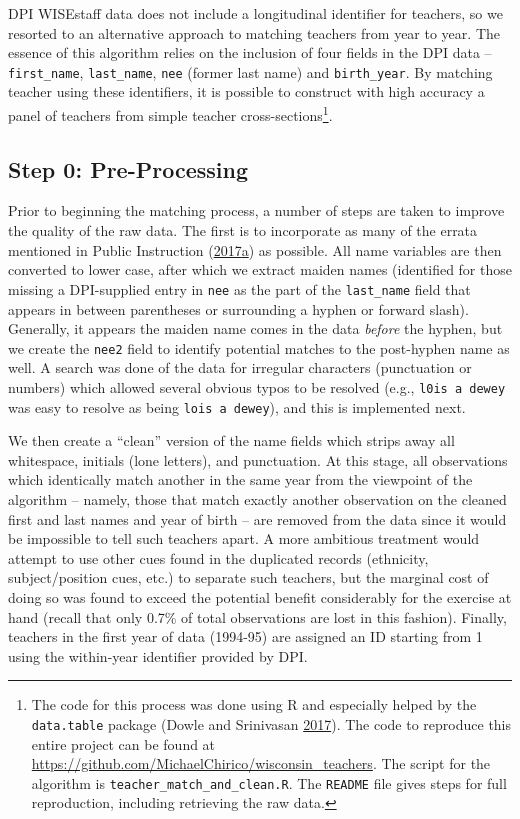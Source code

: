\documentclass[12pt,]{article}
\let\rmarkdownfootnote\footnote%
\def\footnote{\protect\rmarkdownfootnote}
\newcommand{\TAG}[1]{}
\begin{document}
\TAG{BEGIN_APPENDIX}

DPI WISEstaff data does not include a longitudinal identifier for
teachers, so we resorted to an alternative approach to matching teachers
from year to year. The essence of this algorithm relies on the inclusion
of four fields in the DPI data -- \texttt{first\_name},
\texttt{last\_name}, \texttt{nee} (former last name) and
\texttt{birth\_year}. By matching teacher using these identifiers, it is
possible to construct with high accuracy a panel of teachers from simple
teacher cross-sections\footnote{The code for this process was done using
  R and especially helped by the \texttt{data.table} package (Dowle and
  Srinivasan \protect\hyperlink{ref-dowle}{2017}). The code to reproduce
  this entire project can be found at
  \url{https://github.com/MichaelChirico/wisconsin_teachers}. The script
  for the algorithm is \texttt{teacher\_match\_and\_clean.R}. The
  \texttt{README} file gives steps for full reproduction, including
  retrieving the raw data.}.

\subsection{Step 0: Pre-Processing}\label{step-0-pre-processing}

Prior to beginning the matching process, a number of steps are taken to
improve the quality of the raw data. The first is to incorporate as many
of the errata mentioned in Public Instruction
(\protect\hyperlink{ref-dpi_errata}{2017}\protect\hyperlink{ref-dpi_errata}{a})
as possible. All name variables are then converted to lower case, after
which we extract maiden names (identified for those missing a
DPI-supplied entry in \texttt{nee} as the part of the
\texttt{last\_name} field that appears in between parentheses or
surrounding a hyphen or forward slash). Generally, it appears the maiden
name comes in the data \emph{before} the hyphen, but we create the
\texttt{nee2} field to identify potential matches to the post-hyphen
name as well. A search was done of the data for irregular characters
(punctuation or numbers) which allowed several obvious typos to be
resolved (e.g., \texttt{l0is\ a\ dewey} was easy to resolve as being
\texttt{lois\ a\ dewey}), and this is implemented next.

We then create a ``clean'' version of the name fields which strips away
all whitespace, initials (lone letters), and punctuation. At this stage,
all observations which identically match another in the same year from
the viewpoint of the algorithm -- namely, those that match exactly
another observation on the cleaned first and last names and year of
birth -- are removed from the data since it would be impossible to tell
such teachers apart. A more ambitious treatment would attempt to use
other cues found in the duplicated records (ethnicity, subject/position
cues, etc.) to separate such teachers, but the marginal cost of doing so
was found to exceed the potential benefit considerably for the exercise
at hand (recall that only 0.7\% of total observations are lost in this
fashion). Finally, teachers in the first year of data (1994-95) are
assigned an ID starting from 1 using the within-year identifier provided
by DPI.
\end{document}

